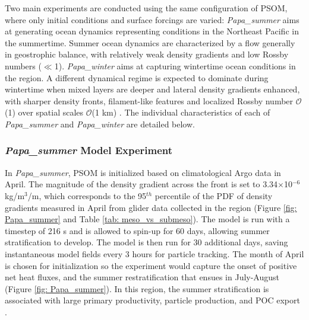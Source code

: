 \documentclass[article,linenumbers]{agujournal2018}
\begin{document}
	Two main experiments are conducted using the same configuration of PSOM, where only initial conditions and surface forcings are varied: \textit{Papa\_summer} aims at generating ocean dynamics representing conditions in the Northeast Pacific in the summertime. Summer ocean dynamics are characterized by a flow generally in geostrophic balance, with relatively weak density gradients and low Rossby numbers ($\ll$1). \textit{Papa\_winter} aims at capturing wintertime ocean conditions in the region. A different dynamical regime is expected to dominate during wintertime when mixed layers are deeper and lateral density gradients enhanced, with sharper density fronts, filament-like features and localized Rossby number $\mathcal{O}$(1) over spatial scales $\mathcal{O}$(1 km) \citep{Mensa_2013,Callies_2015,Thompson_2016}. The individual characteristics of each of \linebreak \textit{Papa\_summer} and \textit{Papa\_winter} are detailed below.
	
	\subsubsection{\textit{Papa\_summer} Model Experiment}
	
	In \textit{Papa\_summer}, PSOM is initialized based on climatological Argo data in April. The magnitude of the density gradient across the front is set to 3.34$\times$10$^{-6}$ kg/m$^3$/m, which corresponds to the 95$^{th}$ percentile of the PDF of density gradients measured in April from glider data collected in the region (Figure \ref{fig: Papa_summer} and Table \ref{tab: meso_vs_submeso}). The model is run with a timestep of 216 s and is allowed to spin-up for 60 days, allowing summer stratification to develop. The model is then run for 30 additional days, saving instantaneous model fields every 3 hours for particle tracking. The month of April is chosen for initialization so the experiment would capture the onset of positive net heat fluxes, and the summer restratification that ensues in July-August (Figure \ref{fig: Papa_summer}). In this region, the summer stratification is associated with large primary productivity, particle production, and POC export \citep[e.g., fecal pellets, dead phytoplankter; ][]{Plant_2016}.
	
\end{document}
